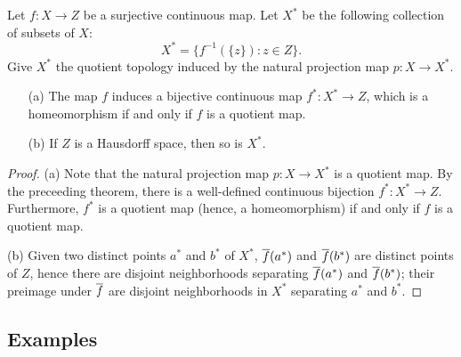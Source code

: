 \begin{cor}
    Let $f: X\rightarrow Z$ be a surjective continuous map.
    Let $X^*$ be the following collection of subsets of $X$:
    \begin{equation*}
        X^*=\{f^{-1}(\{z\}): z\in Z\}.
    \end{equation*}
    Give $X^*$ the quotient topology induced by the natural projection map $p: X\rightarrow X^*$.
    \begin{enumerate}
        \item[(a)]
        {
            The map $f$ induces a bijective continuous map $f^*: X^*\rightarrow Z$, which is a homeomorphism if and only if $f$ is a quotient map.
        }
        \item[(b)]
        {
            If $Z$ is a Hausdorff space, then so is $X^*$.
        }
    \end{enumerate}
\end{cor}
\begin{proof}
    \hangindent=0.65cm
    \noindent(a)
    Note that the natural projection map $p: X\rightarrow X^*$ is a quotient map.
    By the preceeding theorem, there is a well-defined continuous bijection $f^*: X^*\rightarrow Z$.
    Furthermore, $f^*$ is a quotient map (hence, a homeomorphism) if and only if $f$ is a quotient map.

    \noindent(b)
    Given two distinct points $a^*$ and $b^*$ of $X^*$, $\overline{f}(a^*)$ and $\overline{f}(b^*)$ are distinct points of $Z$, hence there are disjoint neighborhoods separating $\overline{f}(a^*)$ and $\overline{f}(b^*)$; their preimage under $\overline{f}$ are disjoint neighborhoods in $X^*$ separating $a^*$ and $b^*$.
\end{proof}

\subsection{Examples}

